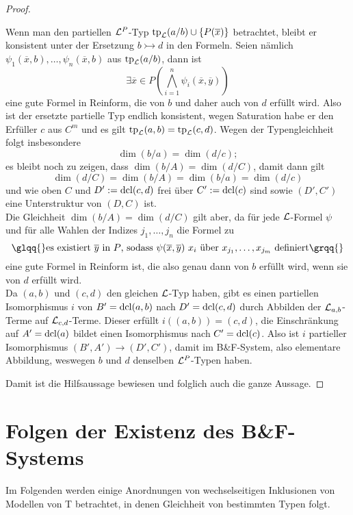 \begin{proof}
\begin{proof2}
		Wenn man den partiellen $\mathcal{L}^P$-Typ $\operatorname{tp}_{\mathcal{L}}(a/b)\cup\{P(\overline{x})\}$ betrachtet, bleibt er konsistent unter der Ersetzung $b\rightarrowtail d$ in den Formeln. Seien nämlich $\psi_1(\overline{x},b),\dots,\psi_n(\overline{x},b)$ aus $\operatorname{tp}_{\mathcal{L}}(a/b)$, dann ist $$\exists\overline{x}\in P(\bigwedge\limits_{i=1}^n\psi_i(\overline{x},\overline{y}))$$ eine gute Formel in Reinform, die von $b$ und daher auch von $d$ erfüllt wird. Also ist der ersetzte partielle Typ endlich konsistent, wegen Saturation habe er den Erfüller $c$ aus $C^m$ und es gilt $\operatorname{tp}_{\mathcal{L}}(a,b)=\operatorname{tp}_{\mathcal{L}}(c,d)$. Wegen der Typengleichheit folgt insbesondere $$\dim(b/a)=\dim(d/c);$$ es bleibt noch zu zeigen, dass $\dim(b/A)=\dim(d/C)$, damit dann gilt $$\dim(d/C)=\dim(b/A)=\dim(b/a)=\dim(d/c)$$ und wie oben $C$ und $D':=\operatorname{dcl}(c,d)$ frei über $C':=\operatorname{dcl}(c)$ sind sowie $(D',C')$ eine Unterstruktur von $(D,C)$ ist.\\
		Die Gleichheit $\dim(b/A)=\dim(d/C)$ gilt aber, da für jede $\mathcal{L}$-Formel $\psi$ und für alle Wahlen der Indizes $j_1,\dots,j_n$ die Formel zu $$\glqq{}\text{es existiert }\overline{y}\text{ in }P\text{, sodass }\psi(\overline{x},\overline{y})\ x_i\text{ über }x_{j_1},\dots,x_{j_m}\text{ definiert}\grqq{}$$ eine gute Formel in Reinform ist, die also genau dann von $b$ erfüllt wird, wenn sie von $d$ erfüllt wird.\\
		Da $(a,b)$ und $(c,d)$ den gleichen $\mathcal{L}$-Typ haben, gibt es einen partiellen Isomorphismus $i$ von $B'=\operatorname{dcl}(a,b)$ nach $D'=\operatorname{dcl}(c,d)$ durch Abbilden der $\mathcal{L}_{a,b}$-Terme auf $\mathcal{L}_{c,d}$-Terme. Dieser erfüllt $i((a,b))=(c,d)$, die Einschränkung auf $A'=\operatorname{dcl}(a)$ bildet einen Isomorphismus nach $C'=\operatorname{dcl}(c)$. Also ist $i$ partieller Isomorphismus $(B',A')\rightarrow(D',C')$, damit im B\&F-System, also elementare Abbildung, weswegen $b$ und $d$ denselben $\mathcal{L}^P$-Typen haben.
	\end{proof2}
    Damit ist die Hilfsaussage bewiesen und folglich auch die ganze Aussage.
\end{proof}

\section{Folgen der Existenz des B\&F-Systems}
Im Folgenden werden einige Anordnungen von wechselseitigen Inklusionen von Modellen von T betrachtet, in denen Gleichheit von bestimmten Typen folgt.

